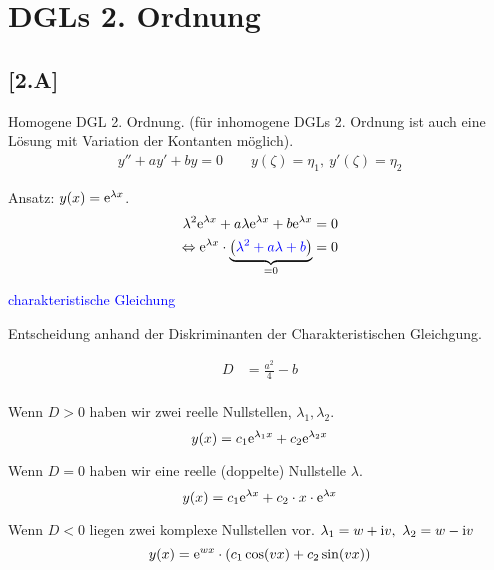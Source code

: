 \documentclass[main.tex]{subfiles}
\begin{document}
\section{DGLs 2. Ordnung}

\subsection*{[2.A]}

Homogene DGL 2. Ordnung. (für inhomogene DGLs 2. Ordnung ist auch eine Lösung mit Variation der Kontanten möglich).
\begin{align*}
	y'' + a y' + by = 0 \qquad y(\zeta) = \eta_1,\ y'(\zeta) = \eta_2
\end{align*}

Ansatz: $y(x) = \mathrm{e}^{\lambda x}$. 
\begin{align*}
	\lambda^2 \mathrm{e}^{\lambda x} + a\lambda \mathrm{e}^{\lambda x} + b\mathrm{e}^{\lambda x} = 0 \\
	\Leftrightarrow \mathrm{e}^{\lambda x} \cdot \underbrace{\left( \textcolor{blue}{\lambda^2 +a\lambda + b} \right)}_{= 0} = 0
\end{align*}

\textcolor{blue}{charakteristische Gleichung}

Entscheidung anhand der Diskriminanten der Charakteristischen Gleichgung.

\begin{align}
	D &= \frac{a^2}{4} -b \\
\end{align}

Wenn $D > 0$ haben wir zwei reelle Nullstellen, $\lambda_1, \lambda_2$.
$$
	y(x) = c_1 \mathrm{e}^{\lambda_1 x} + c_2 \mathrm{e}^{\lambda_2 x} 
$$

Wenn $D = 0$ haben wir eine reelle (doppelte) Nullstelle $\lambda$.
$$
	y(x) = c_1 \mathrm{e}^{\lambda x} + c_2 \cdot x \cdot \mathrm{e}^{\lambda x} 
$$

Wenn $D < 0$ liegen zwei komplexe Nullstellen vor. $\lambda_1 = w + \mathrm{i}v,\ \lambda_2 = w - \mathrm{i}v$
$$
	y(x) = \mathrm{e}^{w x} \cdot \left( c_1 \cos(v x) + c_2 \sin(v x) \right) 
$$
\end{document}

